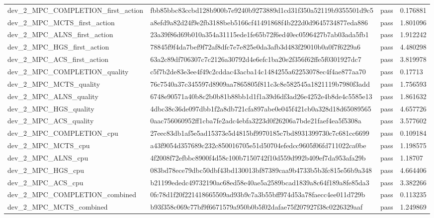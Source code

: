 \begin{tabular}{llll}
dev\_2\_MPC\_COMPLETION\_first\_action & fbb85bbc83ccbd128b900b7e9240b9273889d1cd31f350a52119b9355501d9c5 & pass & 0.176881 \\
dev\_2\_MPC\_MCTS\_first\_action & a8efd9a82d24f9e2fb3188beb5166cf41491868f4b222d0d9645734877eda886 & pass & 1.801096 \\
dev\_2\_MPC\_ALNS\_first\_action & 23a39f86d69b010a354a31115ede1fe65b72f6ed40ec0596427b7ab03ada5fb1 & pass & 1.912242 \\
dev\_2\_MPC\_HGS\_first\_action & 78845f9f4da7bef9f72af8dfc7e7e825e0da3afb3d483f29010b0a0f7f6229a6 & pass & 4.480298 \\
dev\_2\_MPC\_ACS\_first\_action & 63a2c89df706307c7c2126a30792d4e6efc1ba20e2f356f62ffe5f0301927dc7 & pass & 3.819978 \\
dev\_2\_MPC\_COMPLETION\_quality & c5f7b2de83e3ee4f49c2cddac43acba14c1484255a62253078ec4f4ae877aa70 & pass & 0.17713 \\
dev\_2\_MPC\_MCTS\_quality & 76c7540a37c345597d8909aa7865805f811c3c8e582545a1821119b7980f3add & pass & 1.756593 \\
dev\_2\_MPC\_ALNS\_quality & 6748e90571a40b8c2b0b81b88bb1d1f1a39d6df3ad26e4252e4b8de4c5585e13 & pass & 1.861632 \\
dev\_2\_MPC\_HGS\_quality & 4dbc38c36de097dbb1f2a8db721cfa897abe0e045f421cb0a328d18d65089565 & pass & 4.657726 \\
dev\_2\_MPC\_ACS\_quality & 0aac756060952ff1cba7fe2adc4ebfa3223d0f26206a7bde21faef4ea5f5308a & pass & 3.577602 \\
dev\_2\_MPC\_COMPLETION\_cpu & 27eec83db1af5e5ad15373e5d4815bf9970185c7bd8931399730c7c681cc6699 & pass & 0.109184 \\
dev\_2\_MPC\_MCTS\_cpu & a43f9054d357689c232c850016705e51d50704efedcc9605f06fd711022ca0be & pass & 1.198575 \\
dev\_2\_MPC\_ALNS\_cpu & 4f2008f72efbbc8900f4d58c100b7150742f10d559d992b409ef7da953afa29b & pass & 1.18707 \\
dev\_2\_MPC\_HGS\_cpu & 083bd78ece79dbc50dbf43bd130013bf87389caa9b4733b5b3fc815e56b9a348 & pass & 4.664406 \\
dev\_2\_MPC\_ACS\_cpu & b21199ededc49732190ac68ed58e40ae5a2589bcad1839a8c64f189a8fe85da3 & pass & 3.382266 \\
dev\_2\_MPC\_COMPLETION\_combined & 0fc78d1f20f221418665509ad93b9c7a3b55bff974d53a78faecc4ee011d729b & pass & 0.113235 \\
dev\_2\_MPC\_MCTS\_combined & b93f358c069c77bf9f6671579a950b0b5f02dafae75f207927f38c0226329aaf & pass & 1.249869 \\

\end{tabular}
